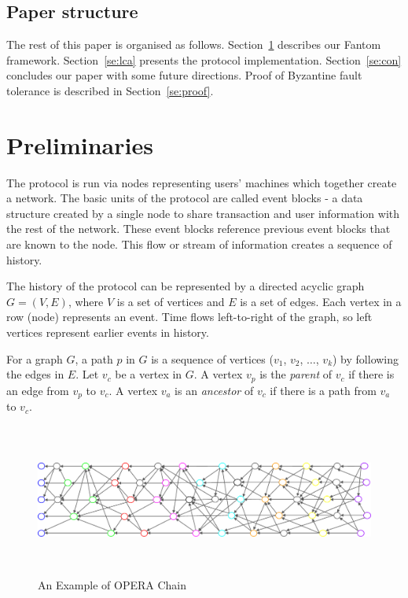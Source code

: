 \documentclass{article}
\begin{document}
\subsection{Paper structure}

The rest of this paper is organised as follows.
Section~\ref{se:prelim} describes our Fantom framework.
Section~\ref{se:lca} presents the protocol implementation.
Section~\ref{se:con} concludes our paper with some future directions.
Proof of Byzantine fault tolerance is described in Section~\ref{se:proof}.


\section{Preliminaries}\label{se:prelim}

The protocol is run via nodes representing users' machines which together create a network. The basic units of the protocol are called event blocks - a data structure created by a single node to share transaction and user information with the rest of the network. These event blocks reference previous event blocks that are known to the node. This flow or stream of information creates a sequence of history.

The history of the protocol can be represented by a directed acyclic graph $G=(V, E)$, where $V$ is a set of vertices and $E$ is a set of edges. Each vertex in a row (node) represents an event. Time flows left-to-right of the graph, so left vertices represent earlier events in history. 

For a graph $G$, a path $p$ in $G$ is a sequence  of vertices ($v_1$, $v_2$, $\dots$, $v_k$) by following the edges in $E$.
Let $v_c$ be a vertex in $G$.
A vertex $v_p$ is the \emph{parent} of $v_c$ if there is an edge from $v_p$ to $v_c$.
A vertex $v_a$ is an \emph{ancestor} of $v_c$ if there is a path from $v_a$ to $v_c$.

\begin{figure}[H] \centering
\includegraphics[height=5cm, width=1.0\columnwidth]{OPERA_chain.pdf}
\caption{An Example of OPERA Chain}
\label{fig:operachain}
\end{figure}
\end{document}
